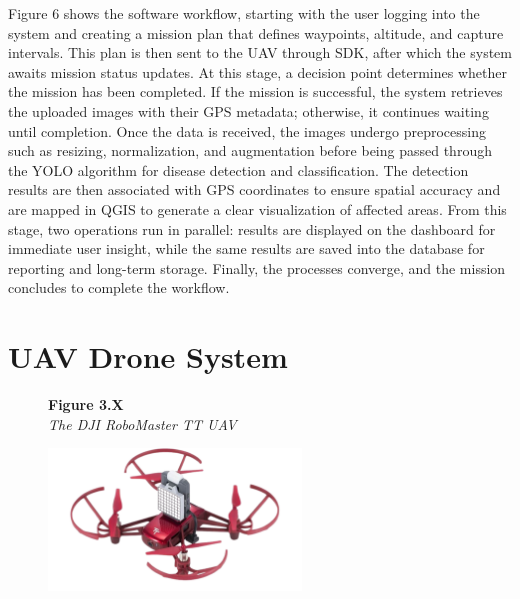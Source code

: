 	Figure 6 shows the software workflow, starting with the user logging into the system and creating a mission plan that defines waypoints, altitude, and capture intervals. This plan is then sent to the UAV through SDK, after which the system awaits mission status updates. At this stage, a decision point determines whether the mission has been completed. If the mission is successful, the system retrieves the uploaded images with their GPS metadata; otherwise, it continues waiting until completion. Once the data is received, the images undergo preprocessing such as resizing, normalization, and augmentation before being passed through the YOLO algorithm for disease detection and classification. The detection results are then associated with GPS coordinates to ensure spatial accuracy and are mapped in QGIS to generate a clear visualization of affected areas. From this stage, two operations run in parallel: results are displayed on the dashboard for immediate user insight, while the same results are saved into the database for reporting and long-term storage. Finally, the processes converge, and the mission concludes to complete the workflow.
	
	\section{UAV Drone System}
	
	\begin{figure}[H]
		\raggedright
		\textbf{Figure 3.X} \\ %
		\textit{The DJI RoboMaster TT UAV} %
		
		\vspace{0.5em}
		\centering
		\includegraphics[width=0.6\textwidth]{figures/robomaster_tt.pdf} %
		
		\vspace{0.5em}
		\raggedright
		
		\label{fig:robomaster_tt}
	\end{figure}
	
